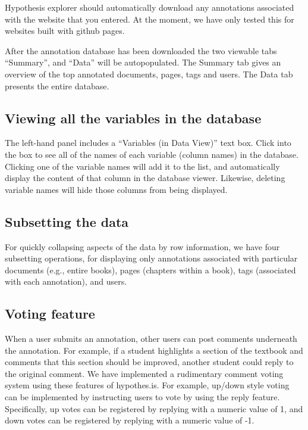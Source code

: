 \documentclass[
]{book}
\begin{document}
Hypothesis explorer should automatically download any annotations associated with the website that you entered. At the moment, we have only tested this for websites built with github pages.

After the annotation database has been downloaded the two viewable tabs ``Summary'', and ``Data'' will be autopopulated. The Summary tab gives an overview of the top annotated documents, pages, tags and users. The Data tab presents the entire database.

\hypertarget{viewing-all-the-variables-in-the-database}{%
\subsection{Viewing all the variables in the database}\label{viewing-all-the-variables-in-the-database}}

The left-hand panel includes a ``Variables (in Data View)'' text box. Click into the box to see all of the names of each variable (column names) in the database. Clicking one of the variable names will add it to the list, and automatically display the content of that column in the database viewer. Likewise, deleting variable names will hide those columns from being displayed.

\hypertarget{subsetting-the-data}{%
\subsection{Subsetting the data}\label{subsetting-the-data}}

For quickly collapsing aspects of the data by row information, we have four subsetting operations, for displaying only annotations associated with particular documents (e.g., entire books), pages (chapters within a book), tags (associated with each annotation), and users.

\hypertarget{voting-feature}{%
\subsection{Voting feature}\label{voting-feature}}

When a user submits an annotation, other users can post comments underneath the annotation. For example, if a student highlights a section of the textbook and comments that this section should be improved, another student could reply to the original comment. We have implemented a rudimentary comment voting system using these features of hypothes.is. For example, up/down style voting can be implemented by instructing users to vote by using the reply feature. Specifically, up votes can be registered by replying with a numeric value of 1, and down votes can be registered by replying with a numeric value of -1.
\end{document}
